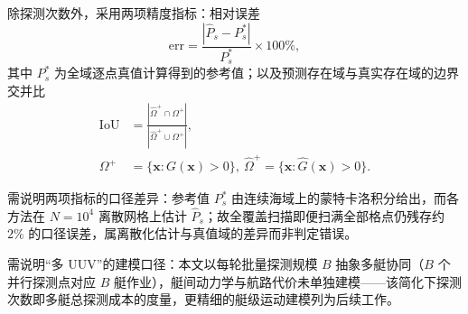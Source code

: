 \documentclass[a4paper,UTF8,zihao=5,twocolumn]{ctexart}
\numberwithin{equation}{section}
\begin{document}
除探测次数外，采用两项精度指标：相对误差
\begin{equation}
  \mathrm{err}=\frac{|\hat P_s-P_s^{\ast}|}{P_s^{\ast}}\times100\%,
  \label{eq:err}
\end{equation}
其中 $P_s^{\ast}$ 为全域逐点真值计算得到的参考值；以及预测存在域与真实存在域的边界交并比
\begin{equation}
\begin{aligned}
  \mathrm{IoU}&=\frac{|\hat\Omega^{+}\cap\Omega^{+}|}{|\hat\Omega^{+}\cup\Omega^{+}|},\\
  \Omega^{+}&=\{\symbf{x}:G(\symbf{x})>0\},\ \hat\Omega^{+}=\{\symbf{x}:\hat G(\symbf{x})>0\}.
\end{aligned}
  \label{eq:iou}
\end{equation}

需说明两项指标的口径差异：参考值 $P_s^{\ast}$ 由连续海域上的蒙特卡洛积分给出，而各方法在 $N=10^4$ 离散网格上估计 $\hat P_s$；故全覆盖扫描即便扫满全部格点仍残存约 $2\%$ 的口径误差，属离散化估计与真值域的差异而非判定错误。

\begin{table}[!t]
  \centering
  \caption{仿真参数设置}
  \label{tab:sim}
\end{table}

需说明“多 UUV”的建模口径：本文以每轮批量探测规模 $B$ 抽象多艇协同（$B$ 个并行探测点对应 $B$ 艇作业），艇间动力学与航路代价未单独建模——该简化下探测次数即多艇总探测成本的度量，更精细的艇级运动建模列为后续工作。
\end{document}
